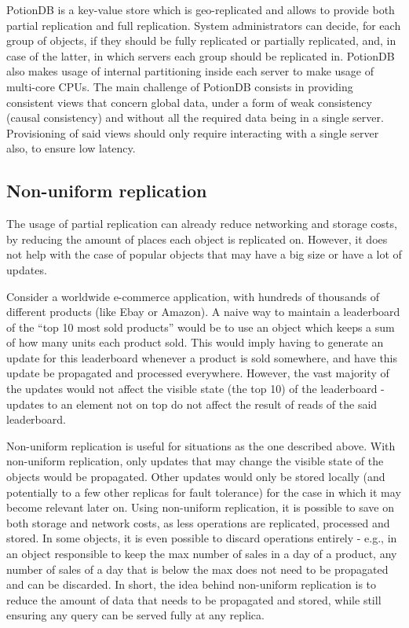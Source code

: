 
PotionDB is a key-value store which is geo-replicated and allows to provide both partial replication and full replication.
System administrators can decide, for each group of objects, if they should be fully replicated or partially replicated, and, in case of the latter, in which servers each group should be replicated in.
PotionDB also makes usage of internal partitioning inside each server to make usage of multi-core CPUs.
The main challenge of PotionDB consists in providing consistent views that concern global data, under a form of weak consistency (causal consistency) and without all the required data being in a single server.
Provisioning of said views should only require interacting with a single server also, to ensure low latency.

\subsection{Non-uniform replication}
\label{subsec:nonuniform}

The usage of partial replication can already reduce networking and storage costs, by reducing the amount of places each object is replicated on.
However, it does not help with the case of popular objects that may have a big size or have a lot of updates.

Consider a worldwide e-commerce application, with hundreds of thousands of different products (like Ebay or Amazon).
A naive way to maintain a leaderboard of the ``top 10 most sold products'' would be to use an object which keeps a sum of how many units each product sold.
This would imply having to generate an update for this leaderboard whenever a product is sold somewhere, and have this update be propagated and processed everywhere.
However, the vast majority of the updates would not affect the visible state (the top 10) of the leaderboard - updates to an element not on top do not affect the result of reads of the said leaderboard.

Non-uniform replication \cite{nonUniform} is useful for situations as the one described above.
With non-uniform replication, only updates that may change the visible state of the objects would be propagated.
Other updates would only be stored locally (and potentially to a few other replicas for fault tolerance) for the case in which it may become relevant later on.
Using non-uniform replication, it is possible to save on both storage and network costs, as less operations are replicated, processed and stored.
In some objects, it is even possible to discard operations entirely \cite{nonUniform} - e.g., in an object responsible to keep the max number of sales in a day of a product, any number of sales of a day that is below the max does not need to be propagated and can be discarded.
In short, the idea behind non-uniform replication is to reduce the amount of data that needs to be propagated and stored, while still ensuring any query can be served fully at any replica.

